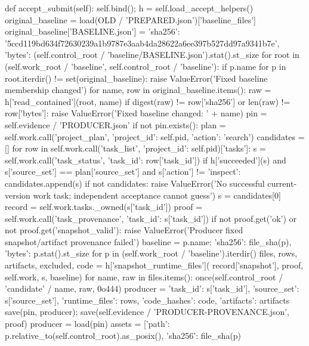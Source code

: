     def accept_submit(self):
        self.bind(); h = self.load_accept_helpers()
        original_baseline = load(OLD / 'PREPARED.json')['baseline_files']
        original_baseline['BASELINE.json'] = {
            'sha256': '5ccd119bd634f72630239a1b9787e3aab4da28622a6ee397b527dd97a9341b7e',
            'bytes': (self.control_root / 'baseline/BASELINE.json').stat().st_size}
        for root in (self.work_root / 'baseline', self.control_root / 'baseline'):
            if {p.name for p in root.iterdir()} != set(original_baseline):
                raise ValueError('Fixed baseline membership changed')
            for name, row in original_baseline.items():
                raw = h['read_contained'](root, name)
                if digest(raw) != row['sha256'] or len(raw) != row['bytes']:
                    raise ValueError('Fixed baseline changed: ' + name)
        pin = self.evidence / 'PRODUCER.json'
        if not pin.exists():
            plan = self.work.call('project_plan', {'project_id': self.pid, 'action': 'search'})
            candidates = []
            for row in self.work.call('task_list', {'project_id': self.pid})['tasks']:
                s = self.work.call('task_status', {'task_id': row['task_id']})
                if h['succeeded'](s) and s['source_set'] == plan['source_set'] and s['action'] != 'inspect':
                    candidates.append(s)
            if not candidates:
                raise ValueError('No successful current-version work task; independent acceptance cannot guess')
            s = candidates[0]
            record = self.work.tasks._owned(s['task_id'])
            proof = self.work.call('task_provenance', {'task_id': s['task_id']})
            if not proof.get('ok') or not proof.get('snapshot_valid'):
                raise ValueError('Producer fixed snapshot/artifact provenance failed')
            baseline = {p.name: {'sha256': file_sha(p), 'bytes': p.stat().st_size}
                        for p in (self.work_root / 'baseline').iterdir()}
            files, rows, artifacts, excluded, code = h['snapshot_runtime_files'](
                record['snapshot'], proof, self.work, s, baseline)
            for name, raw in files.items():
                once(self.control_root / 'candidate' / name, raw, 0o444)
            producer = {'task_id': s['task_id'], 'source_set': s['source_set'], 'runtime_files': rows,
                        'code_hashes': code, 'artifacts': artifacts}
            save(pin, producer); save(self.evidence / 'PRODUCER-PROVENANCE.json', proof)
        producer = load(pin)
        assets = [{'path': p.relative_to(self.control_root).as_posix(), 'sha256': file_sha(p)}
